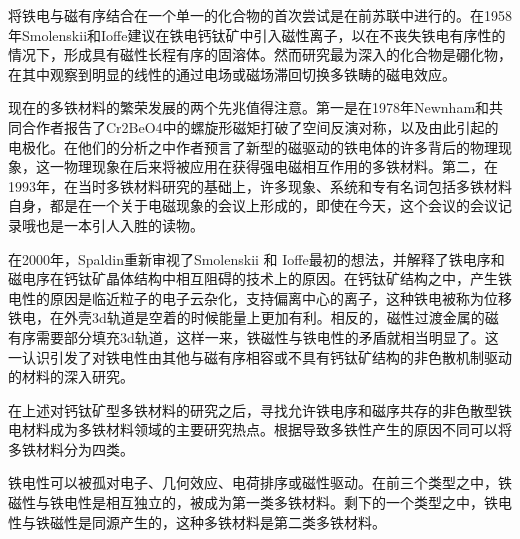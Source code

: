 将铁电与磁有序结合在一个单一的化合物的首次尝试是在前苏联中进行的。在1958年Smolenskii和Ioffe建议在铁电钙钛矿中引入磁性离子，以在不丧失铁电有序性的情况下，形成具有磁性长程有序的固溶体。然而研究最为深入的化合物是硼化物，在其中观察到明显的线性的通过电场或磁场滞回切换多铁畴的磁电效应。

现在的多铁材料的繁荣发展的两个先兆值得注意。第一是在1978年Newnham和共同合作者报告了Cr2BeO4中的螺旋形磁矩打破了空间反演对称，以及由此引起的电极化。在他们的分析之中作者预言了新型的磁驱动的铁电体的许多背后的物理现象，这一物理现象在后来将被应用在获得强电磁相互作用的多铁材料。第二，在1993年，在当时多铁材料研究的基础上，许多现象、系统和专有名词包括多铁材料自身，都是在一个关于电磁现象的会议上形成的，即使在今天，这个会议的会议记录哦也是一本引人入胜的读物。

在2000年，Spaldin重新审视了Smolenskii 和 Ioffe最初的想法，并解释了铁电序和磁电序在钙钛矿晶体结构中相互阻碍的技术上的原因。在钙钛矿结构之中，产生铁电性的原因是临近粒子的电子云杂化，支持偏离中心的离子，这种铁电被称为位移铁电，在外壳3d轨道是空着的时候能量上更加有利。相反的，磁性过渡金属的磁有序需要部分填充3d轨道，这样一来，铁磁性与铁电性的矛盾就相当明显了。这一认识引发了对铁电性由其他与磁有序相容或不具有钙钛矿结构的非色散机制驱动的材料的深入研究。

在上述对钙钛矿型多铁材料的研究之后，寻找允许铁电序和磁序共存的非色散型铁电材料成为多铁材料领域的主要研究热点。根据导致多铁性产生的原因不同可以将多铁材料分为四类。

铁电性可以被孤对电子、几何效应、电荷排序或磁性驱动。在前三个类型之中，铁磁性与铁电性是相互独立的，被成为第一类多铁材料。剩下的一个类型之中，铁电性与铁磁性是同源产生的，这种多铁材料是第二类多铁材料。
